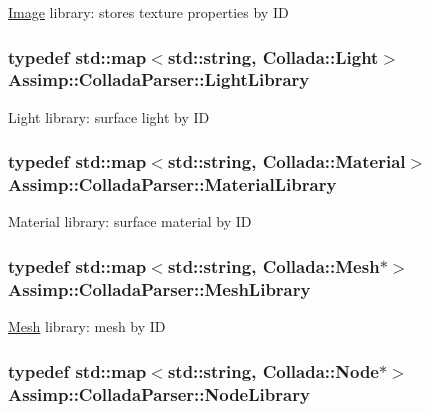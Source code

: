 \hyperlink{class_image}{Image} library\+: stores texture properties by I\+D \hypertarget{class_assimp_1_1_collada_parser_a873173a2311c52691fb25d153f376542}{
\subsubsection[{Light\+Library}]{\setlength{\rightskip}{0pt plus 5cm}typedef std\+::map$<$std\+::string, {\bf Collada\+::\+Light}$>$ {\bf Assimp\+::\+Collada\+Parser\+::\+Light\+Library}\hspace{0.3cm}{\ttfamily [protected]}}}\label{class_assimp_1_1_collada_parser_a873173a2311c52691fb25d153f376542}
Light library\+: surface light by I\+D \hypertarget{class_assimp_1_1_collada_parser_ade2fe0008281313e1e5d4ba71fc8f0aa}{
\subsubsection[{Material\+Library}]{\setlength{\rightskip}{0pt plus 5cm}typedef std\+::map$<$std\+::string, {\bf Collada\+::\+Material}$>$ {\bf Assimp\+::\+Collada\+Parser\+::\+Material\+Library}\hspace{0.3cm}{\ttfamily [protected]}}}\label{class_assimp_1_1_collada_parser_ade2fe0008281313e1e5d4ba71fc8f0aa}
Material library\+: surface material by I\+D \hypertarget{class_assimp_1_1_collada_parser_ae07977eafea3e73f8c2915319bbb143b}{
\subsubsection[{Mesh\+Library}]{\setlength{\rightskip}{0pt plus 5cm}typedef std\+::map$<$std\+::string, {\bf Collada\+::\+Mesh}$\ast$$>$ {\bf Assimp\+::\+Collada\+Parser\+::\+Mesh\+Library}\hspace{0.3cm}{\ttfamily [protected]}}}\label{class_assimp_1_1_collada_parser_ae07977eafea3e73f8c2915319bbb143b}
\hyperlink{class_mesh}{Mesh} library\+: mesh by I\+D \hypertarget{class_assimp_1_1_collada_parser_a21771be88a79eb4ae05001bd205020ad}{
\subsubsection[{Node\+Library}]{\setlength{\rightskip}{0pt plus 5cm}typedef std\+::map$<$std\+::string, {\bf Collada\+::\+Node}$\ast$$>$ {\bf Assimp\+::\+Collada\+Parser\+::\+Node\+Library}\hspace{0.3cm}{\ttfamily [protected]}}}\label{class_assimp_1_1_collada_parser_a21771be88a79eb4ae05001bd205020ad}
